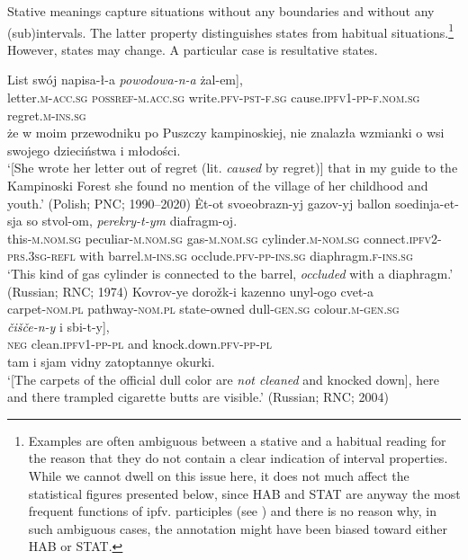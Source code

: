 \documentclass[output=paper]{langscibook}
\begin{document}
Stative meanings capture situations without any boundaries and without any (sub)intervals. The latter property distinguishes states from habitual situations.\footnote{Examples are often ambiguous between a stative and a habitual reading for the reason that they do not contain a clear indication of interval properties. While we cannot dwell on this issue here, it does not much affect the statistical figures presented below, since HAB and STAT are anyway the most frequent functions of ipfv. participles (see ) and there is no reason why, in such ambiguous cases, the annotation might have been biased toward either HAB or STAT.\label{wiem:foot:ExamplesAreOften}} However, states may change. A particular case is resultative states.


\ea\label{wiem:ex:caused}{ 
\gll \minsp{[} {List} {swój} {napisa-ł-a} \textit{{powodowa-n-a}} {żal-em}], \\
{} letter.\textsc{m-acc.sg} \textsc{possref-m.acc.sg} write.\textsc{pfv-pst-f.sg} cause.\textsc{ipfv1-pp-f.nom.sg} regret.\textsc{m-ins.sg} \\
\glt
{że w moim przewodniku po Puszczy kampinoskiej, nie znalazła wzmianki o wsi swojego dzieciństwa i młodości}.\\
‘[She wrote her letter out of regret (lit. \textit{caused} by regret)] that in my guide to the Kampinoski Forest she found no mention of the village of her childhood and youth.’ \hfill (Polish; PNC; 1990--2020)
}
\ex\label{wiem:ex:covered}{ \gll
{Ėt-ot} {svoeobrazn-yj} {gazov-yj} {ballon} {soedinja-et-sja} {so} {stvol-om}, \textit{{perekry-t-ym}} {diafragm-oj}.\\
this-\textsc{m.nom.sg} peculiar-\textsc{m.nom.sg} gas-\textsc{m.nom.sg} cylinder.\textsc{m-nom.sg} connect.\textsc{ipfv2-prs.3sg-refl} with barrel.\textsc{m-ins.sg} occlude.\textsc{pfv-pp-ins.sg} diaphragm.\textsc{f-ins.sg} \\
\glt ‘This kind of gas cylinder is connected to the barrel, \textit{occluded} with a diaphragm.’ \hfill (Russian; RNC; 1974)
}
\ex\label{wiem:ex:cleaned}{ \gll
\minsp{[} {Kovrov-ye} {dorožk-i} {kazenno} {unyl-ogo} {cvet-a} \\
{} carpet-\textsc{nom.pl} pathway-\textsc{nom.pl} state-owned dull-\textsc{gen.sg} colour.\textsc{m-gen.sg}\\
 {\textit{čišče-n-y}} {i} {sbi-t-y}],\\
\textsc{neg} clean.\textsc{ipfv1-pp-pl} and knock.down.\textsc{pfv-pp-pl}\\
{tam i sjam vidny zatoptannye okurki.}\\
\glt ‘[The carpets of the official dull color are \textit{not cleaned} and knocked down], here and there trampled cigarette butts are visible.’ \hfill (Russian; RNC; 2004)
}
\end{document}
